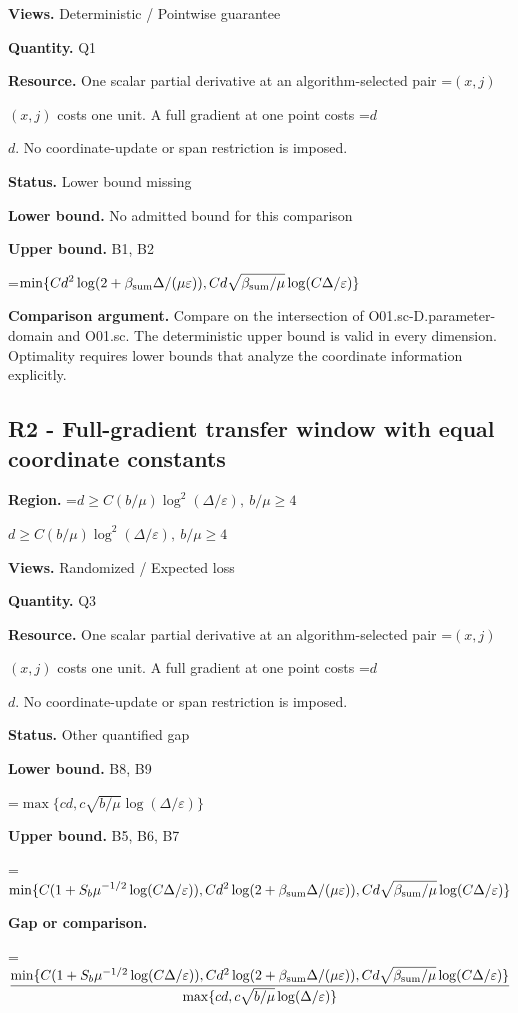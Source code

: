 \documentclass[10pt,a4paper]{article}
\newcommand{\AtlasMath}[1]{\par\begingroup\centering\setbox0=\hbox{$\displaystyle #1$}\ifdim\wd0>1.4\linewidth\typeout{ATLAS WIDE FORMULA: \the\wd0}\fi\ifdim\wd0>\linewidth\resizebox{\linewidth}{!}{\box0}\else\box0\fi\par\endgroup}
\newcommand{\AtlasInlineMath}[1]{\begingroup\setbox0=\hbox{$#1$}\ifdim\wd0>.4\linewidth\endgroup\AtlasMath{#1}\else\endgroup$#1$\fi}
\begin{document}
\textbf{Views.} Deterministic / Pointwise guarantee

\textbf{Quantity.} Q1

\textbf{Resource.} One scalar partial derivative at an algorithm-selected pair \AtlasInlineMath{(x,j)} costs one unit. A full gradient at one point costs \AtlasInlineMath{d}. No coordinate-update or span restriction is imposed.

\textbf{Status.} Lower bound missing

\textbf{Lower bound.} No admitted bound for this comparison

\textbf{Upper bound.} B1, B2

\AtlasMath{\min\{Cd^2\log(2+\beta_{\rm sum}\Delta/(\mu\varepsilon)),Cd\sqrt{\beta_{\rm sum}/\mu}\log(C\Delta/\varepsilon)\}}
\textbf{Comparison argument.} Compare on the intersection of O01.sc-D.parameter-domain and O01.sc. The deterministic upper bound is valid in every dimension. Optimality requires lower bounds that analyze the coordinate information explicitly.

\subsection{R2 - Full-gradient transfer window with equal coordinate constants}
\textbf{Region.} \AtlasInlineMath{d\ge C(b/\mu)\log^2(\Delta/\varepsilon),\ b/\mu\ge4}

\textbf{Views.} Randomized / Expected loss

\textbf{Quantity.} Q3

\textbf{Resource.} One scalar partial derivative at an algorithm-selected pair \AtlasInlineMath{(x,j)} costs one unit. A full gradient at one point costs \AtlasInlineMath{d}. No coordinate-update or span restriction is imposed.

\textbf{Status.} Other quantified gap

\textbf{Lower bound.} B8, B9

\AtlasMath{\max\{cd,c\sqrt{b/\mu}\log(\Delta/\varepsilon)\}}
\textbf{Upper bound.} B5, B6, B7

\AtlasMath{\min\{C(1+S_b\mu^{-1/2}\log(C\Delta/\varepsilon)),Cd^2\log(2+\beta_{\rm sum}\Delta/(\mu\varepsilon)),Cd\sqrt{\beta_{\rm sum}/\mu}\log(C\Delta/\varepsilon)\}}
\textbf{Gap or comparison.} 
\AtlasMath{\frac{\min\{C(1+S_b\mu^{-1/2}\log(C\Delta/\varepsilon)),Cd^2\log(2+\beta_{\rm sum}\Delta/(\mu\varepsilon)),Cd\sqrt{\beta_{\rm sum}/\mu}\log(C\Delta/\varepsilon)\}}{\max\{cd,c\sqrt{b/\mu}\log(\Delta/\varepsilon)\}}}
\end{document}

